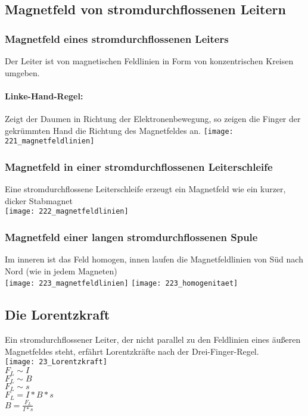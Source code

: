 \documentclass[12pt]{scrartcl}
\begin{document}
\begin{flushleft}
		\subsection{Magnetfeld von stromdurchflossenen Leitern}
			\subsubsection{Magnetfeld eines stromdurchflossenen Leiters}
			Der Leiter ist von magnetischen Feldlinien in Form von konzentrischen Kreisen umgeben. \\
			\paragraph{Linke-Hand-Regel:} Zeigt der Daumen in Richtung der Elektronenbewegung, so zeigen die Finger der gekrümmten Hand die Richtung des Magnetfeldes an. 
			\texttt{[image: 221\_magnetfeldlinien]}
			
			\subsubsection{Magnetfeld in einer stromdurchflossenen Leiterschleife}
			Eine stromdurchflossene Leiterschleife erzeugt ein Magnetfeld wie ein kurzer, dicker Stabmagnet \\
			\texttt{[image: 222\_magnetfeldlinien]}
			
			\subsubsection{Magnetfeld einer langen stromdurchflossenen Spule}
			Im inneren ist das Feld homogen, innen laufen die Magnetfeldlinien von Süd nach Nord (wie in jedem Magneten) \\
			\texttt{[image: 223\_magnetfeldlinien]}
			\texttt{[image: 223\_homogenitaet]}
			\newpage
			
		\subsection{Die Lorentzkraft}
		Ein stromdurchflossener Leiter, der nicht parallel zu den Feldlinien eines äußeren Magnetfeldes steht, erfährt Lorentzkräfte nach der Drei-Finger-Regel. \\
		\texttt{[image: 23\_Lorentzkraft]} \\
		$ F_L \sim I $ 
		\vspace{1mm} \\
		$ F_L \sim B $
		\vspace{1mm} \\
		$ F_L \sim s $
		\vspace{1mm} \\
		$ F_L = I \ast B \ast s $
		\vspace{1mm} \\
		$ B = \frac{F_L}{I \ast s} $
		

\end{flushleft}
\end{document}
